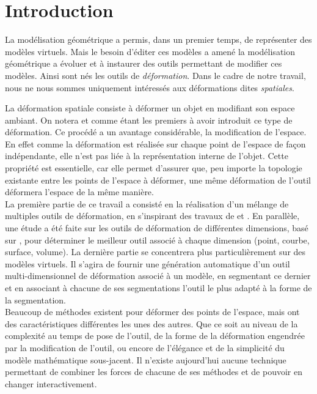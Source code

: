 \chapter{Introduction}

\graphicspath{ {Introduction/IntroductionFigs/PNG/}
  {Introduction/IntroductionFigs/PDF/}
  {Introduction/IntroductionFigs/} }

La modélisation géométrique a permis, dans un premier temps, de
représenter des modèles virtuels. Mais le besoin d'éditer ces modèles
a amené la modélisation géométrique a évoluer et à instaurer des
outils permettant de modifier ces modèles. Ainsi sont nés les outils
de \textit{déformation}. Dans le cadre de notre travail, nous ne nous
sommes uniquement intéressés aux déformations dites
\textit{spatiales}.

La déformation spatiale consiste à déformer un objet en modifiant son
espace ambiant.  On notera \cite{Bar84} et \cite{SP86} comme étant les
premiers à avoir introduit ce type de déformation. Ce procédé a un
avantage considérable, la modification de l'espace. En effet comme la
déformation est réalisée sur chaque point de l'espace de façon
indépendante, elle n'est pas liée à la représentation interne de
l'objet. Cette propriété est essentielle, car elle permet d'assurer
que, peu importe la topologie existante entre les points de l'espace à
déformer, une même déformation de l'outil déformera l'espace de la
même manière.
\\

La première partie de ce travail a consisté en la réalisation d'un
mélange de multiples outils de déformation, en s'inspirant des travaux
de \cite{JBPS11} et \cite{GPCP13}. En parallèle, une étude a été faite
sur les outils de déformation de différentes dimensions, basé sur
\cite{GB08}, pour déterminer le meilleur outil associé à chaque
dimension (point, courbe, surface, volume).  La dernière partie se
concentrera plus particulièrement sur des modèles virtuels. Il s'agira
de fournir une génération automatique d'un outil multi-dimensionnel de
déformation associé à un modèle, en segmentant ce dernier et en
associant à chacune de ses segmentations l'outil le plus adapté à la
forme de la segmentation.
\\

Beaucoup de méthodes existent pour déformer des points de l'espace,
mais ont des caractéristiques différentes les unes des autres. Que ce
soit au niveau de la complexité au temps de pose de l'outil, de la
forme de la déformation engendrée par la modification de l'outil, ou
encore de l'élégance et de la simplicité du modèle mathématique
sous-jacent. Il n'existe aujourd'hui aucune technique permettant de
combiner les forces de chacune de ses méthodes et de pouvoir en
changer interactivement.
\\

